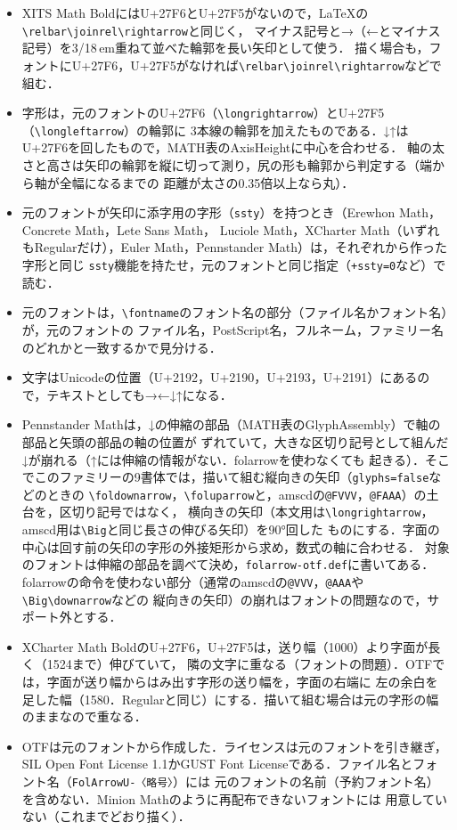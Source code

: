\documentclass[dvipdfmx,paper=a4]{jlreq}
\newcommand\pkg[1]{\textsf{#1}}
\newcommand\file[1]{\texttt{#1}}
\begin{document}
\begin{itemize}
\item XITS Math BoldにはU+27F6とU+27F5がないので，\LaTeX{}の\verb|\relbar\joinrel\rightarrow|と同じく，
  マイナス記号と→（←とマイナス記号）を3/18\,em重ねて並べた輪郭を長い矢印として使う．
  描く場合も，フォントにU+27F6，U+27F5がなければ\verb|\relbar\joinrel\rightarrow|などで組む．
\item 字形は，元のフォントのU+27F6（\verb|\longrightarrow|）とU+27F5（\verb|\longleftarrow|）の輪郭に
  3本線の輪郭を加えたものである．↓↑はU+27F6を回したもので，MATH表のAxisHeightに中心を合わせる．
  軸の太さと高さは矢印の輪郭を縦に切って測り，尻の形も輪郭から判定する（端から軸が全幅になるまでの
  距離が太さの0.35倍以上なら丸）．
\item 元のフォントが矢印に添字用の字形（\texttt{ssty}）を持つとき（Erewhon Math，Concrete Math，Lete Sans Math，
  Luciole Math，XCharter Math（いずれもRegularだけ），Euler Math，Pennstander Math）は，それぞれから作った字形と同じ
  \texttt{ssty}機能を持たせ，元のフォントと同じ指定（\verb|+ssty=0|など）で読む．
\item 元のフォントは，\verb|\fontname|のフォント名の部分（ファイル名かフォント名）が，元のフォントの
  ファイル名，PostScript名，フルネーム，ファミリー名のどれかと一致するかで見分ける．
\item 文字はUnicodeの位置（U+2192，U+2190，U+2193，U+2191）にあるので，テキストとしても→←↓↑になる．
\item Pennstander Mathは，↓の伸縮の部品（MATH表のGlyphAssembly）で軸の部品と矢頭の部品の軸の位置が
  ずれていて，大きな区切り記号として組んだ↓が崩れる（↑には伸縮の情報がない．\pkg{folarrow}を使わなくても
  起きる）．そこでこのファミリーの9書体では，描いて組む縦向きの矢印（\verb|glyphs=false|などのときの
  \verb|\foldownarrow|，\verb|\foluparrow|と，\pkg{amscd}の\verb|@FVVV|，\verb|@FAAA|）の土台を，区切り記号ではなく，
  横向きの矢印（本文用は\verb|\longrightarrow|，\pkg{amscd}用は\verb|\Big|と同じ長さの伸びる矢印）を90°回した
  ものにする．字面の中心は回す前の矢印の字形の外接矩形から求め，数式の軸に合わせる．
  対象のフォントは伸縮の部品を調べて決め，\file{folarrow-otf.def}に書いてある．
  \pkg{folarrow}の命令を使わない部分（通常の\pkg{amscd}の\verb|@VVV|，\verb|@AAA|や\verb|\Big\downarrow|などの
  縦向きの矢印）の崩れはフォントの問題なので，サポート外とする．
\item XCharter Math BoldのU+27F6，U+27F5は，送り幅（1000）より字面が長く（1524まで）伸びていて，
  隣の文字に重なる（フォントの問題）．OTFでは，字面が送り幅からはみ出す字形の送り幅を，字面の右端に
  左の余白を足した幅（1580．Regularと同じ）にする．描いて組む場合は元の字形の幅のままなので重なる．
\item OTFは元のフォントから作成した．ライセンスは元のフォントを引き継ぎ，
  SIL Open Font License 1.1かGUST Font Licenseである．ファイル名とフォント名（\texttt{FolArrowU-〈略号〉}）には
  元のフォントの名前（予約フォント名）を含めない．Minion Mathのように再配布できないフォントには
  用意していない（これまでどおり描く）．
\end{itemize}
\end{document}
